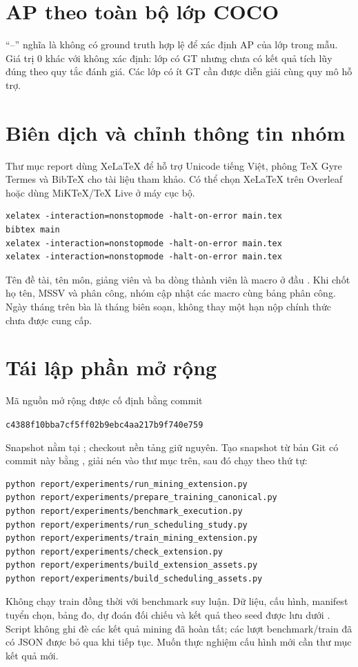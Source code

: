 \section{AP theo toàn bộ lớp COCO}

``--'' nghĩa là không có ground truth hợp lệ để xác định AP của lớp trong mẫu. Giá trị 0 khác với không xác định: lớp có GT nhưng chưa có kết quả tích lũy đúng theo quy tắc đánh giá. Các lớp có ít GT cần được diễn giải cùng quy mô hỗ trợ.

\section{Biên dịch và chỉnh thông tin nhóm}
Thư mục report dùng XeLaTeX để hỗ trợ Unicode tiếng Việt, phông TeX Gyre Termes và BibTeX cho tài liệu tham khảo. Có thể chọn XeLaTeX trên Overleaf hoặc dùng MiKTeX/TeX Live ở máy cục bộ.
\begin{lstlisting}[language={},caption={Biên dịch thủ công trong thư mục report}]
xelatex -interaction=nonstopmode -halt-on-error main.tex
bibtex main
xelatex -interaction=nonstopmode -halt-on-error main.tex
xelatex -interaction=nonstopmode -halt-on-error main.tex
\end{lstlisting}
Tên đề tài, tên môn, giảng viên và ba dòng thành viên là macro ở đầu . Khi chốt họ tên, MSSV và phân công, nhóm cập nhật các macro cùng bảng phân công. Ngày tháng trên bìa là tháng biên soạn, không thay một hạn nộp chính thức chưa được cung cấp.

\section{Tái lập phần mở rộng}
Mã nguồn mở rộng được cố định bằng commit
\begin{center}\small\texttt{c4388f10bba7cf5ff02b9ebc4aa217b9f740e759}\end{center}
Snapshot nằm tại ; checkout nền tảng giữ nguyên. Tạo snapshot từ bản Git có commit này bằng , giải nén vào thư mục trên, sau đó chạy theo thứ tự:
\begin{lstlisting}[language={},caption={Lệnh tái lập mining, huấn luyện và benchmark}]
python report/experiments/run_mining_extension.py
python report/experiments/prepare_training_canonical.py
python report/experiments/benchmark_execution.py
python report/experiments/run_scheduling_study.py
python report/experiments/train_mining_extension.py
python report/experiments/check_extension.py
python report/experiments/build_extension_assets.py
python report/experiments/build_scheduling_assets.py
\end{lstlisting}
Không chạy train đồng thời với benchmark suy luận. Dữ liệu, cấu hình, manifest tuyển chọn, bảng đo, dự đoán đối chiếu và kết quả theo seed được lưu dưới . Script không ghi đè các kết quả mining đã hoàn tất; các lượt benchmark/train đã có JSON được bỏ qua khi tiếp tục. Muốn thực nghiệm cấu hình mới cần thư mục kết quả mới.



